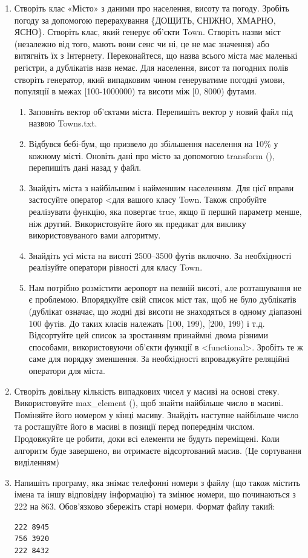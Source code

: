 \documentclass[a5paper,titlepage,openany,twoside,draft]{book_unv}%
\makeatletter
\newcommand{\xslalph}[1]{\expandafter\@xslalph\csname c@#1\endcsname}
\newcommand{\@xslalph}[1]{%
    \ifcase#1\or а\or б\or в\or г\or д\or e\or є\or ж\or з\or i%
    \or й\or к\or л\or м\or н\or о\or п\or р\or с\or т%
    \or у\or ф\or х\or ц\or ч\or ш\or ю\or я\or аа\or бб\or вв%
    \else\@ctrerr\fi%
}
\makeatother
\begin{document}
\begin{enumerate}
\item
  Створіть клас «Місто» з даними про населення, висоту та погоду.
  Зробіть погоду за допомогою перерахування \{ДОЩИТЬ, СНІЖНО, ХМАРНО,
  ЯСНО\}. Створіть клас, який генерує об'єкти Town. Створіть назви міст
  (незалежно від того, мають вони сенс чи ні, це не має значення) або
  витягніть їх з Інтернету. Переконайтеся, що назва всього міста має
  маленькі регістри, а дублікатів назв немає. Для населення, висот та погодних
  полів створіть генератор, який випадковим чином генеруватиме погодні
  умови, популяції в межах {[}100-1000000) та висоти між {[}0, 8000)
  футами. 
\begin{enumerate}[label=\xslalph*)]
\item
Заповніть вектор об'єктами міста. Перепишіть вектор у новий
  файл під назвою Towns.txt. 
 
  \item
 Відбувся бебі-бум, що призвело до збільшення населення на 10\% у кожному
місті. Оновіть дані про місто за допомогою transform (), перепишіть дані
назад у файл. 
\item
Знайдіть міста з найбільшим і найменшим населенням. Для цієї вправи
  застосуйте оператор \textless{}для вашого класу Town. Також спробуйте
  реалізувати функцію, яка повертає true, якщо її перший параметр менше,
  ніж другий. Використовуйте його як предикат для виклику
  використовуваного вами алгоритму.
 \item
Знайдіть усі міста на висоті 2500--3500 футів включно. За необхідності
реалізуйте оператори рівності для класу Town.
 \item
  Нам потрібно розмістити аеропорт на певній висоті, але розташування не
  є проблемою. Впорядкуйте свій список міст так, щоб не було дублікатів
  (дублікат означає, що жодні дві висоти не знаходяться в одному
  діапазоні 100 футів. До таких класів належать {[}100, 199), {[}200,
  199) і т.д. Відсортуйте цей список за зростанням принаймні двома
  різними способами, використовуючи об'єкти функції в
  \textless{}functional\textgreater{}. Зробіть те ж саме для порядку
  зменшення. За необхідності впроваджуйте реляційні оператори для міста.
\end{enumerate}
\item
  Створіть довільну кількість випадкових чисел у масиві на основі стеку.
  Використовуйте max\_element (), щоб знайти найбільше число в масиві.
  Поміняйте його номером у кінці масиву. Знайдіть наступне найбільше
  число та росташуйте його в масиві в позиції перед попереднім числом.
  Продовжуйте це робити, доки всі елементи не будуть переміщені. Коли
  алгоритм буде завершено, ви отримаєте відсортований масив. (Це
  сортування виділенням)
\item
  Напишіть програму, яка знімає телефонні номери з файлу (що також
  містить імена та іншу відповідну інформацію) та змінює номери, що
  починаються з 222 на 863. Обов'язково збережіть старі номери. Формат
  файлу такий:
\begin{verbatim}
222 8945
756 3920
222 8432
\end{verbatim}


\end{enumerate}
\end{document}
